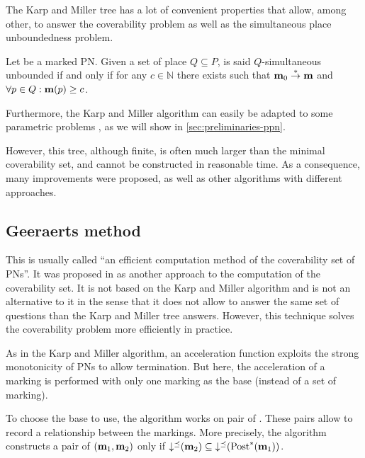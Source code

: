 
The Karp and Miller tree has a lot of convenient properties that allow, among other, to answer the coverability problem as well as the simultaneous place unboundedness problem.

\begin{defi}
  Let \NPTm be a marked \ac{PN}.
  Given a set of place $Q \subseteq P$, \N is said $Q$-simultaneous unbounded if and only if for any $c \in \mathbb{N}$ there exists \mar such that $\mathbf{m}_0 \stackrel{*}{\to} \mathbf{m}$ and $\forall p \in Q : \mathbf{m}(p) \geq c$.
\end{defi}

Furthermore, the Karp and Miller algorithm can easily be adapted to some parametric problems \cite{David17}, as we will show in \autoref{sec:preliminaries-ppn}.

However, this tree, although finite, is often much larger than the minimal coverability set, and cannot be constructed in reasonable time.
As a consequence, many improvements were proposed, as well as other algorithms with different approaches.

\subsection{Geeraerts method}
\label{sec:eff}

This is usually called ``an efficient computation method of the coverability set of \acp{PN}''.
It was proposed in \cite{Geeraerts07thesis, Geeraerts07} as another approach to the computation of the coverability set.
It is not based on the Karp and Miller algorithm and is not an alternative to it in the sense that it does not allow to answer the same set of questions than the Karp and Miller tree answers.
However, this technique solves the coverability problem more efficiently in practice.

As in the Karp and Miller algorithm, an acceleration function exploits the strong monotonicity of \acp{PN} to allow termination.
But here, the acceleration of a marking is performed with only one marking as the base (instead of a set of marking).

To choose the base to use, the algorithm works on pair of \omarks.
These pairs allow to record a relationship between the markings.
More precisely, the algorithm constructs a pair of \omarks $(\mathbf{m}_1, \mathbf{m}_2)$ only if $\operatorname{\downarrow^\preceq}(\mathbf{m}_2) \subseteq \operatorname{\downarrow^\preceq}(\operatorname{Post}^*(\mathbf{m}_1))$.

